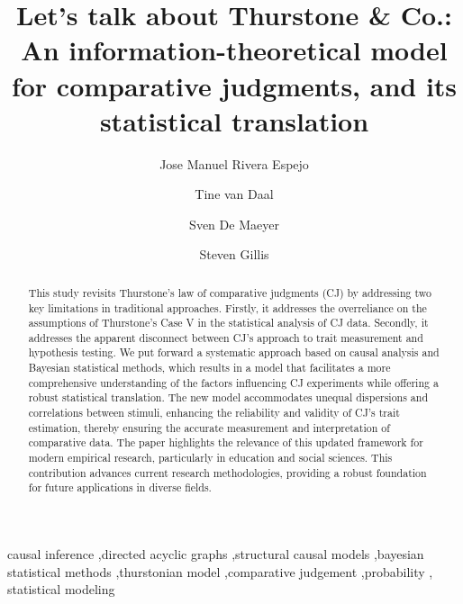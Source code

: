 \documentclass[
  authoryear,
  review,
  1p]{elsarticle}
\begin{document}
\begin{frontmatter}
\title{Let's talk about Thurstone \& Co.: An information-theoretical
model for comparative judgments, and its statistical translation}
\author[1]{Jose Manuel Rivera Espejo%
%
}
\author[1]{Tine van Daal%
%
}
\author[1]{Sven De Maeyer%
%
}
\author[2]{Steven Gillis%
%
}






        
\begin{abstract}
This study revisits Thurstone's law of comparative judgments (CJ) by
addressing two key limitations in traditional approaches. Firstly, it
addresses the overreliance on the assumptions of Thurstone's Case V in
the statistical analysis of CJ data. Secondly, it addresses the apparent
disconnect between CJ's approach to trait measurement and hypothesis
testing. We put forward a systematic approach based on causal analysis
and Bayesian statistical methods, which results in a model that
facilitates a more comprehensive understanding of the factors
influencing CJ experiments while offering a robust statistical
translation. The new model accommodates unequal dispersions and
correlations between stimuli, enhancing the reliability and validity of
CJ's trait estimation, thereby ensuring the accurate measurement and
interpretation of comparative data. The paper highlights the relevance
of this updated framework for modern empirical research, particularly in
education and social sciences. This contribution advances current
research methodologies, providing a robust foundation for future
applications in diverse fields.
\end{abstract}





\begin{keyword}
    causal inference \sep directed acyclic graphs \sep structural causal
models \sep bayesian statistical methods \sep thurstonian
model \sep comparative judgement \sep probability \sep 
    statistical modeling
\end{keyword}
\end{frontmatter}
    
\end{document}
